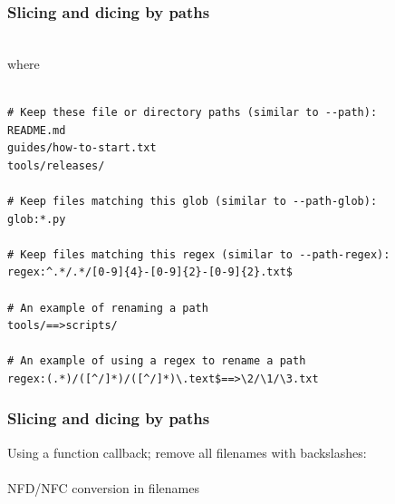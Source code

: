 \documentclass[compress,t,aspectratio=169]{beamer}
\begin{document}

\begin{frame}[containsverbatim]
  \frametitle{Slicing and dicing by paths}

  {\footnotesize
  \\
  where\\
  \\
  \begin{verbatim}
# Keep these file or directory paths (similar to --path):
README.md
guides/how-to-start.txt
tools/releases/

# Keep files matching this glob (similar to --path-glob):
glob:*.py

# Keep files matching this regex (similar to --path-regex):
regex:^.*/.*/[0-9]{4}-[0-9]{2}-[0-9]{2}.txt$

# An example of renaming a path
tools/==>scripts/

# An example of using a regex to rename a path
regex:(.*)/([^/]*)/([^/]*)\.text$==>\2/\1/\3.txt
  \end{verbatim}
  }

\end{frame}


\begin{frame}
  \frametitle{Slicing and dicing by paths}

  Using a function callback; remove all filenames with backslashes:\\
  \\

  \pause
  \vspace{0.75\baselineskip}
  NFD/NFC conversion in filenames\\

\end{frame}
\end{document}
